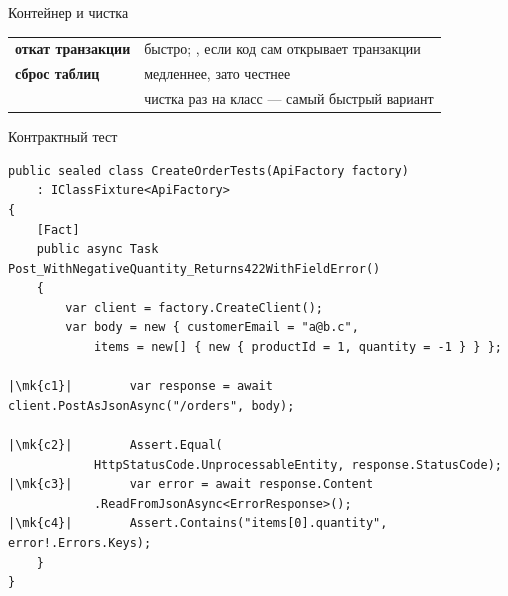 \documentclass[aspectratio=169,10pt,t]{beamer}
\newcommand{\codexxs}{\ttfamily\fontsize{6.8}{7.8}\selectfont}
\newcommand{\mk}[1]{\tikz[remember picture,overlay]\coordinate (#1) at (0,0.55ex);}
\begin{document}
\begin{frame}{Контейнер и чистка}
  \slidetop

  {\renewcommand{\arraystretch}{1.5}
  \begin{tabular}{@{}L{4.2cm}L{8.6cm}@{}}
    \textbf{откат транзакции}       & быстро; , если код сам
      открывает транзакции \\
    \textbf{сброс таблиц}           & медленнее, зато честнее \\
     & чистка раз на класс --- самый быстрый
      вариант \\
  \end{tabular}}

  \slidegap
\end{frame}

\begin{frame}[fragile]{Контрактный тест}
  \vspace{0.2em}
\begin{lstlisting}[style=csharp,basicstyle=\codexxs,escapechar=|]
public sealed class CreateOrderTests(ApiFactory factory)
    : IClassFixture<ApiFactory>
{
    [Fact]
    public async Task Post_WithNegativeQuantity_Returns422WithFieldError()
    {
        var client = factory.CreateClient();
        var body = new { customerEmail = "a@b.c",
            items = new[] { new { productId = 1, quantity = -1 } } };

|\mk{c1}|        var response = await client.PostAsJsonAsync("/orders", body);

|\mk{c2}|        Assert.Equal(
            HttpStatusCode.UnprocessableEntity, response.StatusCode);
|\mk{c3}|        var error = await response.Content
            .ReadFromJsonAsync<ErrorResponse>();
|\mk{c4}|        Assert.Contains("items[0].quantity", error!.Errors.Keys);
    }
}
\end{lstlisting}
\end{frame}
\end{document}
